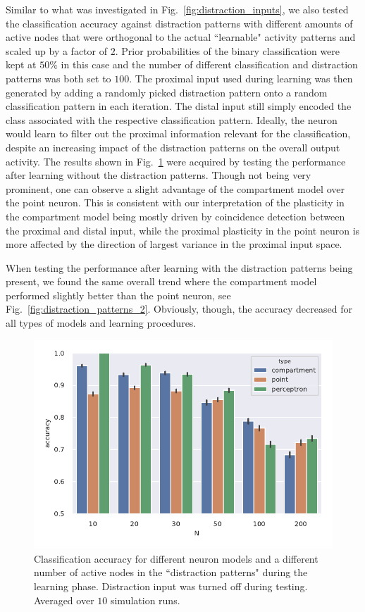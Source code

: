 \documentclass[10pt,a4paper]{article}
\begin{document}
Similar to what was investigated in Fig.~\ref{fig:distraction_inputs}, we also tested the classification accuracy against distraction patterns with different amounts of active nodes that were orthogonal to the actual ``learnable" activity patterns and scaled up by a factor of $2$. Prior probabilities of the binary classification were kept at $50\%$ in this case and the number of different classification and distraction patterns was both set to $100$. The proximal input used during learning was then generated by adding a randomly picked distraction pattern onto a random classification pattern in each iteration. The distal input still simply encoded the class associated with the respective classification pattern. Ideally, the neuron would learn to filter out the proximal information relevant for the classification, despite an increasing impact of the distraction patterns on the overall output activity. The results shown in Fig.~\ref{fig:distraction_patterns} were acquired by testing the performance after learning without the distraction patterns. Though not being very prominent, one can observe a slight advantage of the compartment model over the point neuron. This is consistent with our interpretation of the plasticity in the compartment model being mostly driven by coincidence detection between the proximal and distal input, while the proximal plasticity in the point neuron is more affected by the direction of largest variance in the proximal input space.

When testing the performance after learning with the distraction patterns being present, we found the same overall trend where the compartment model performed slightly better than the point neuron, see Fig.~\ref{fig:distraction_patterns_2}. Obviously, though, the accuracy decreased for all types of models and learning procedures.

\begin{figure}
	\includegraphics[width=\textwidth]{./figures/accuracy_distraction_patterns_no_distraction_during_testing.pdf}
	\caption{Classification accuracy for different neuron models and a different number of active nodes in the ``distraction patterns" during the learning phase. Distraction input was turned off during testing. Averaged over $10$ simulation runs.}
	\label{fig:distraction_patterns}
\end{figure}
\end{document}
